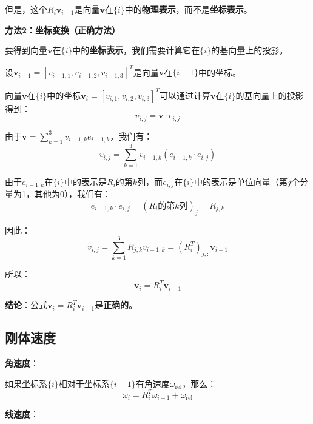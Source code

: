\documentclass[12pt,a4paper]{article}
\begin{document}
但是，这个$R_i \mathbf{v}_{i-1}$是向量$\mathbf{v}$在$\{i\}$中的\textbf{物理表示}，而不是\textbf{坐标表示}。

\textbf{方法2：坐标变换（正确方法）}

要得到向量$\mathbf{v}$在$\{i\}$中的\textbf{坐标表示}，我们需要计算它在$\{i\}$的基向量上的投影。

设$\mathbf{v}_{i-1} = [v_{i-1,1}, v_{i-1,2}, v_{i-1,3}]^T$是向量$\mathbf{v}$在$\{i-1\}$中的坐标。

向量$\mathbf{v}$在$\{i\}$中的坐标$\mathbf{v}_i = [v_{i,1}, v_{i,2}, v_{i,3}]^T$可以通过计算$\mathbf{v}$在$\{i\}$的基向量上的投影得到：
\begin{equation}
v_{i,j} = \mathbf{v} \cdot e_{i,j}
\end{equation}

由于$\mathbf{v} = \sum_{k=1}^3 v_{i-1,k} e_{i-1,k}$，我们有：
\begin{equation}
v_{i,j} = \sum_{k=1}^3 v_{i-1,k} (e_{i-1,k} \cdot e_{i,j})
\end{equation}

由于$e_{i-1,k}$在$\{i\}$中的表示是$R_i$的第$k$列，而$e_{i,j}$在$\{i\}$中的表示是单位向量（第$j$个分量为1，其他为0），我们有：
\begin{equation}
e_{i-1,k} \cdot e_{i,j} = (R_i \text{的第$k$列})_j = R_{j,k}
\end{equation}

因此：
\begin{equation}
v_{i,j} = \sum_{k=1}^3 R_{j,k} v_{i-1,k} = (R_i^T)_{j,:} \mathbf{v}_{i-1}
\end{equation}

所以：
\begin{equation}
\mathbf{v}_i = R_i^T \mathbf{v}_{i-1}
\end{equation}

\textbf{结论}：公式$\mathbf{v}_i = R_i^T \mathbf{v}_{i-1}$是\textbf{正确的}。

\subsection{刚体速度}

\textbf{角速度}：

如果坐标系$\{i\}$相对于坐标系$\{i-1\}$有角速度$\omega_{\text{rel}}$，那么：
\begin{equation}
\omega_i = R_i^T \omega_{i-1} + \omega_{\text{rel}}
\end{equation}

\textbf{线速度}：
\end{document}
